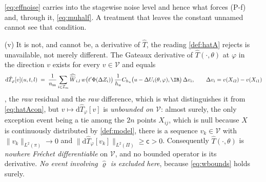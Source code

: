 \begin{proposition}
\begin{enumerate}
\eqref{eq:effnoise} carries into the stagewise noise level and hence what forces (P-f) and, through it,
\eqref{eq:muhalf}. A treatment that leaves the constant unnamed cannot see that condition.
\item[(v)] It is not, and cannot be, a derivative of $\hat T$, the reading
\cref{def:hatA} rejects is unavailable, not merely different. The Gateaux derivative of
$\hat T(\cdot,\theta)$ at $\varphi$ in the direction $v$ exists for every $v\in\mathcal V$ and equals
\begin{equation}\label{eq:gateaux}
\mathrm d\hat T_\varphi[v](u,t,l)\;=\;\frac1{n_{\mathrm m}}\sum_{i\in\mathcal I_m}
\widehat{\widetilde W}_{i,l}\,w\big(t'\Phi(\Delta Z_i)\big)\,\frac1{h_u}
C_{h_u}\big(u-\Delta U_i(\theta,\varphi),\IR\big)\,\Delta v_i,
\qquad \Delta v_i=v(X_{i2})-v(X_{i1})
\end{equation}
, the \emph{raw} residual and the \emph{raw} difference, which is what distinguishes it from
\eqref{eq:hatAcon}, 
but $v\mapsto\mathrm d\hat T_\varphi[v]$ is \emph{unbounded on $\mathcal V$}: almost surely, the only
exception event being a tie among the $2n$ points $X_{ij}$, which is null because $X$ is continuously
distributed by \cref{def:model}, there is a sequence $v_k\in\mathcal V$ with
$\|v_k\|_{L^{2}(\pi)}\to0$ and $\|\mathrm d\hat T_\varphi[v_k]\|_{L^{2}(\Pi)}\ge\mathsf c>0$.
Consequently $\hat T(\cdot,\theta)$ is \emph{nowhere Fr\'echet differentiable} on $\mathcal V$, and no
bounded operator is its derivative. \emph{No event involving $\hat\varrho$ is excluded here}, because
\eqref{eq:wbounds} holds surely.
\end{enumerate}
\end{proposition}


